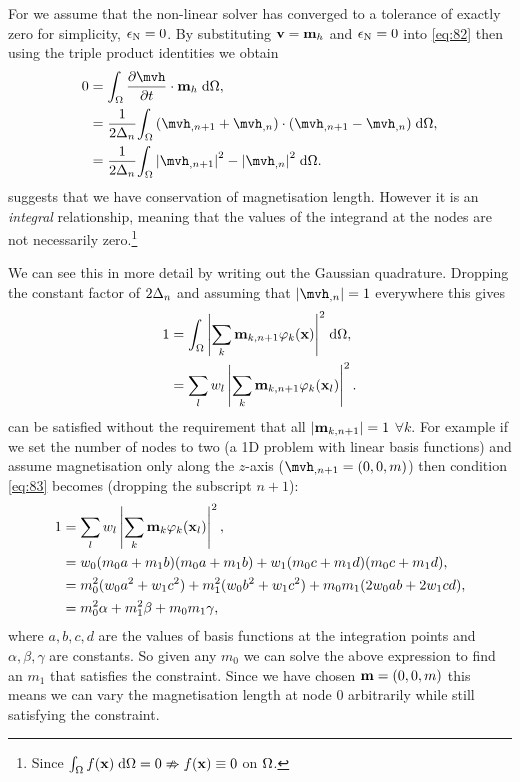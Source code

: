 {For  we assume that the non-linear solver has converged to a tolerance of exactly zero for simplicity, \ie $\epsilon_{\mathrm{N}} = 0$.
By substituting $\boldsymbol{\mathrm{v}} = \boldsymbol{\mathrm{m}}_h$ and $\epsilon_{\mathrm{N}} = 0$ into \cref{eq:82} then using the triple product identities we obtain
\begin{equation}
  \label{eq:23}
  \begin{aligned}
    0 &= \ipg{\dmdth}{\mv_h}, \\
    &= \frac{1}{2\dtn} \intd{(\mvh_{,n+1} + \mvh_{,n}) \cdot (\mvh_{,n+1} - \mvh_{,n})}, \\
    &= \frac{1}{2\dtn} \intd{\abs{\mvh_{,n+1}}^2 - \abs{\mvh_{,n}}^2}.
  \end{aligned}
\end{equation}
 suggests that we have conservation of magnetisation length.
However it is an \emph{integral} relationship, meaning that the values of the integrand at the nodes are not necessarily zero.\footnote{Since ${\int_{\Omega} { f(\boldsymbol{\mathrm{x}})} {\; \mathrm{{d}}} {\Omega}} = 0 \nRightarrow f(\boldsymbol{\mathrm{x}}) \equiv 0$ on $\Omega$.}

We can see this in more detail by writing out the Gaussian quadrature.
Dropping the constant factor of $2\Delta_{n}$ and assuming that $\abs{\mvh_{,n}} = 1$ everywhere this gives
\begin{equation}
  \begin{aligned}
    1 &= {\int_{\Omega} {\left|{\sum_k \boldsymbol{\mathrm{m}}_{k, n+1} \varphi_k(\boldsymbol{\mathrm{x}})} \right|^2} {\; \mathrm{{d}}} {\Omega}}, \\
    &= \sum_l w_l \left|{\sum_k \boldsymbol{\mathrm{m}}_{k, n+1} \varphi_k(\boldsymbol{\mathrm{x}}_l)} \right|^2.
    \label{eq:83}
  \end{aligned}
\end{equation}
 can be satisfied without the requirement that all $\left|{\boldsymbol{\mathrm{m}}_{k, n+1}} \right| = 1$ $\forall k$.
For example if we set the number of nodes to two (\ie a 1D problem with linear basis functions) and assume magnetisation only along the $z$-axis (\ie  $\mvh_{,n+1} = (0, 0, m)$) then condition \cref{eq:83} becomes (dropping the subscript $n+1$):
\begin{equation}
  \begin{aligned}
    1 &= \sum_l w_l \left|{\sum_k \boldsymbol{\mathrm{m}}_{k} \varphi_k(\boldsymbol{\mathrm{x}}_l)} \right|^2, \\
    &= w_0 (m_{0} a + m_{1} b)(m_{0} a + m_{1} b) + w_1 (m_{0} c + m_{1} d)(m_{0} c + m_{1} d), \\
    &= m_{0}^2 (w_0 a^2 + w_1 c^2) + m_{1}^2 (w_0 b^2 + w_1 c^2) + m_{0} m_{1} (2w_0ab + 2w_1cd), \\
    &= m_{0}^2 \alpha + m_{1}^2 \beta + m_{0} m_{1} \gamma, \\
  \end{aligned}
\end{equation}
where $a,b,c,d$ are the values of basis functions at the integration points and $\alpha, \beta, \gamma$ are constants.
So given any $m_{0}$ we can solve the above expression to find an $m_{1}$ that satisfies the constraint.
Since we have chosen $\boldsymbol{\mathrm{m}} = (0, 0, m)$ this means we can vary the magnetisation length at node 0 arbitrarily while still satisfying the constraint.

}
